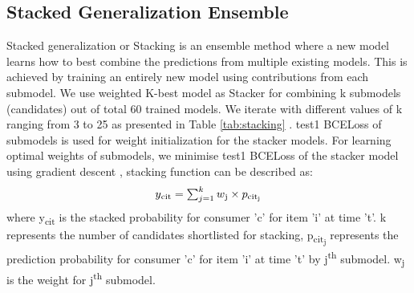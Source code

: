 \subsection{Stacked Generalization Ensemble}
Stacked generalization or Stacking \cite{wolpert1992stacked} is an ensemble method where a new model learns how to best 
combine the predictions from multiple existing models. This is achieved by training an entirely new model using 
contributions from each submodel. 
We use weighted K-best model as Stacker for combining k submodels (candidates) out of total 60 
trained models. We iterate with different values of k ranging from 3 to 25 as presented in Table \ref{tab:stacking} . 
test1 BCELoss of submodels is used for weight initialization for the stacker models. For learning optimal weights of submodels, 
we minimise test1 BCELoss of the stacker model using gradient descent \cite{ruder2016overview},
stacking function can be described as:
  \begin{equation}
    \begin{array}{l}
      y\textsubscript{cit} =\sum_{j=1}^{k}w\textsubscript{j} \times p\textsubscript{cit\textsubscript{j}}
    \end{array}
    \label{eqn:stack}
  \end{equation}
where y\textsubscript{cit} is the stacked probability for consumer 'c' for item ’i’ at time ’t’.
k represents the number of candidates shortlisted for stacking, p\textsubscript{cit\textsubscript{j}}
represents the prediction probability for consumer 'c' for item ’i’ at time ’t’ by j\textsuperscript{th} submodel.
w\textsubscript{j} is the weight for j\textsuperscript{th} submodel.

